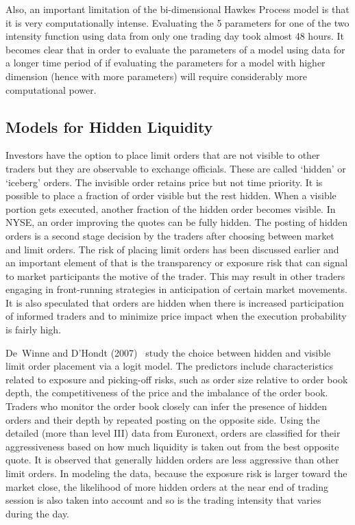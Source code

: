 Also, an important limitation of the bi-dimensional Hawkes Process model is that it is very computationally intense. Evaluating the 5 parameters for one of the two intensity function using data from only one trading day took almost 48 hours. It becomes clear that in order to evaluate the parameters of a model using data for a longer time period of if evaluating the parameters for a model with higher dimension (hence with more parameters) will require considerably more computational power. 



\subsection{Models for Hidden Liquidity}

Investors have the option to place limit orders that are not visible to other traders but they are observable to exchange officials. These are called `hidden' or `iceberg' orders. The invisible order retains price but not time priority. It is possible to place a fraction of order visible but the rest hidden. When a visible portion gets executed, another fraction of the hidden order becomes visible. In NYSE, an order improving the quotes can be fully hidden. The posting of hidden orders is a second stage decision by the traders after choosing between market and limit orders. The risk of placing limit orders has been discussed earlier and an important element of that is the transparency or exposure risk that can signal to market participants the motive of the trader. This may result in other traders engaging in front-running strategies in anticipation of certain market movements. It is also speculated that orders are hidden when there is increased participation of informed traders and to minimize price impact when the execution probability is fairly high. 


De~Winne and D'Hondt (2007)~\cite{winne} study the choice between hidden and visible limit order placement via a logit model. The predictors include characteristics related to exposure and picking-off risks, such as order size relative to order book depth, the competitiveness of the price and the imbalance of the order book. Traders who monitor the order book closely can infer the presence of hidden orders and their depth by repeated posting on the opposite side. Using the detailed (more than level III) data from Euronext, orders are classified for their aggressiveness based on how much liquidity is taken out from the best opposite quote. It is observed that generally hidden orders are less aggressive than other limit orders. In modeling the data, because the exposure risk is larger toward the market close, the likelihood of more hidden orders at the near end of trading session is also taken into account and so is the trading intensity that varies during the day. 


